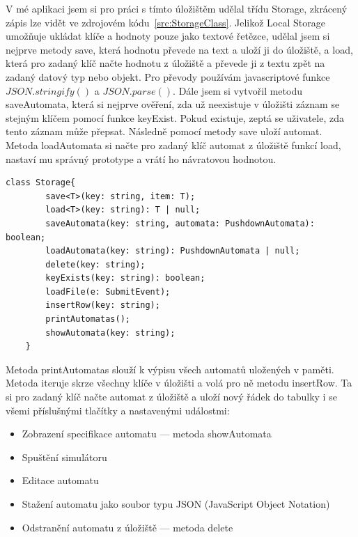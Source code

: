 V mé aplikaci jsem si pro práci s tímto úložištěm udělal třídu Storage, zkrácený zápis lze vidět ve zdrojovém kódu~\ref{src:StorageClass}. Jelikož Local Storage umožňuje ukládat klíče a hodnoty pouze jako textové řetězce, udělal jsem si nejprve metody save, která hodnotu převede na text a uloží ji do úložiště, a load, která pro zadaný klíč načte hodnotu z úložiště a převede ji z textu zpět na zadaný datový typ nebo objekt. Pro převody používám javascriptové funkce $JSON.stringify()$ a $JSON.parse()$. Dále jsem si vytvořil metodu saveAutomata, která si nejprve ověření, zda už neexistuje v úložišti záznam se stejným klíčem pomocí funkce keyExist. Pokud existuje, zeptá se uživatele, zda tento záznam může přepsat. Následně pomocí metody save uloží automat. Metoda loadAutomata si načte pro zadaný klíč automat z úložiště funkcí load, nastaví mu správný prototype a vrátí ho návratovou hodnotou. 

\begin{lstlisting}[label=src:StorageClass, caption={třída Storage}]
    class Storage{
        save<T>(key: string, item: T);
        load<T>(key: string): T | null;
        saveAutomata(key: string, automata: PushdownAutomata): boolean;
        loadAutomata(key: string): PushdownAutomata | null;
        delete(key: string);
        keyExists(key: string): boolean;
        loadFile(e: SubmitEvent);
        insertRow(key: string);
        printAutomatas();
        showAutomata(key: string);
    }
\end{lstlisting}

Metoda printAutomatas slouží k výpisu všech automatů uložených v paměti. Metoda iteruje skrze všechny klíče v úložišti a volá pro ně metodu insertRow. Ta si pro zadaný klíč načte automat z úložiště a uloží nový řádek do tabulky i se všemi příslušnými tlačítky a nastavenými událostmi:
\begin{itemize}
    \item Zobrazení specifikace automatu --- metoda showAutomata
    \item Spuštění simulátoru
    \item Editace automatu
    \item Stažení automatu jako soubor typu JSON (JavaScript Object Notation)
    \item Odstranění automatu z úložiště --- metoda delete
\end{itemize}


